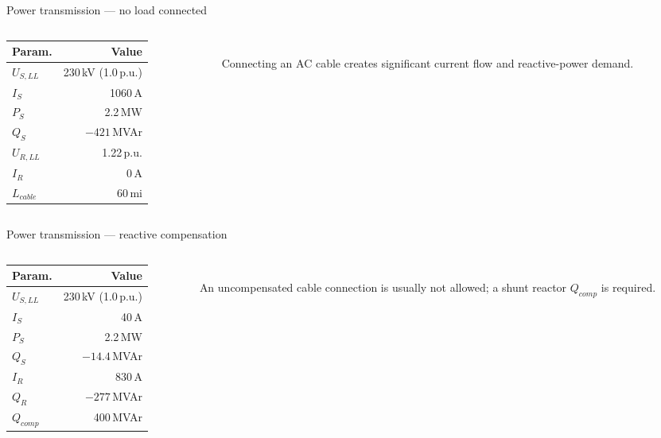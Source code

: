 \begin{frame}{Power transmission --- no load connected}
  \begin{columns}[c,onlytextwidth]
    \begin{column}{0.40\textwidth}
      \renewcommand{\arraystretch}{1.2}
      \begin{tabular}{@{}l r@{}}
        \textbf{Param.} & \textbf{Value} \\
        \hline
        $U_{S,LL}$ & 230\,kV (1.0\,p.u.) \\
        $I_S$ & 1060\,A \\
        $P_S$ & 2.2\,MW \\
        $Q_S$ & $-421$\,MVAr \\
        $U_{R,LL}$ & 1.22\,p.u. \\
        $I_R$ & 0\,A \\
        $L_{cable}$ & 60\,mi \\
        \hline
      \end{tabular}
    \end{column}
    \begin{column}{0.56\textwidth}\centering
      \\[0.3em]
      {\footnotesize Connecting an AC cable creates significant current flow and reactive-power demand.}
    \end{column}
  \end{columns}
\end{frame}

\begin{frame}{Power transmission --- reactive compensation}
  \begin{columns}[c,onlytextwidth]
    \begin{column}{0.40\textwidth}
      \renewcommand{\arraystretch}{1.2}
      \begin{tabular}{@{}l r@{}}
        \textbf{Param.} & \textbf{Value} \\
        \hline
        $U_{S,LL}$ & 230\,kV (1.0\,p.u.) \\
        $I_S$ & 40\,A \\
        $P_S$ & 2.2\,MW \\
        $Q_S$ & $-14.4$\,MVAr \\
        $I_R$ & 830\,A \\
        $Q_R$ & $-277$\,MVAr \\
        $Q_{comp}$ & 400\,MVAr \\
        \hline
      \end{tabular}
    \end{column}
    \begin{column}{0.56\textwidth}\centering
      \\[0.3em]
      {\footnotesize An uncompensated cable connection is usually not allowed; a shunt reactor $Q_{comp}$ is required.}
    \end{column}
  \end{columns}
\end{frame}

